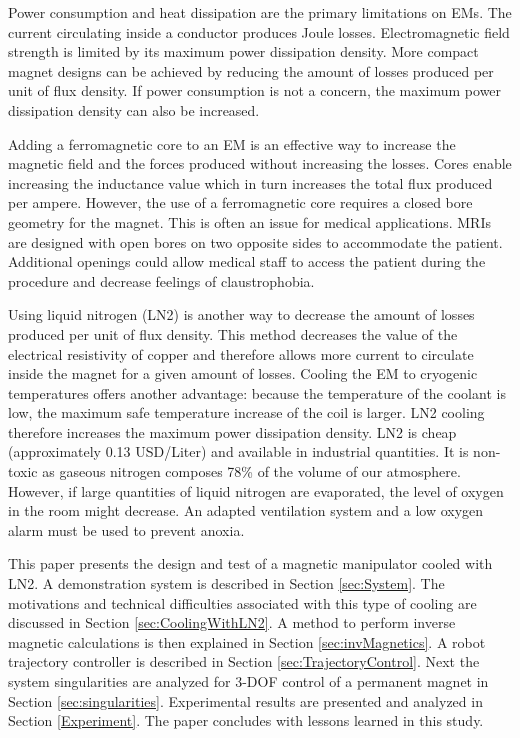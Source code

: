  Power consumption and heat dissipation are the primary limitations on EMs. 
 The current circulating inside a conductor produces Joule losses.
 Electromagnetic field strength is limited by its maximum power dissipation density. 
  More compact magnet designs can be achieved by reducing the amount of losses produced per unit of flux density. 
  If power consumption is not a concern, the maximum power dissipation density can also be increased.\par
Adding a ferromagnetic core to an EM is an effective way to increase the magnetic field and the forces produced without increasing the losses.
 Cores enable increasing the inductance value which in turn increases the total flux produced per ampere. 
 However, the use of a ferromagnetic core requires a closed bore geometry for the magnet. 
 This is often an issue for medical applications. 
  MRIs are designed with open bores on two opposite sides to accommodate the patient. 
 Additional openings could allow medical staff to access the patient during the procedure and decrease feelings of claustrophobia.\par    
Using liquid nitrogen (LN2) is another way to decrease the amount of losses produced per unit of flux density. 
This method decreases the value of the electrical resistivity of copper and therefore allows more current to circulate inside the magnet for a given amount of losses. 
Cooling the EM to cryogenic temperatures offers another advantage: because the temperature of the coolant is low, the maximum safe temperature increase of the coil is larger. 
LN2 cooling therefore increases the maximum power dissipation density. 
LN2 is cheap (approximately 0.13 USD/Liter) and available in industrial quantities. 
It is non-toxic as gaseous nitrogen composes 78\% of the volume of our atmosphere. However, if large quantities of liquid nitrogen are evaporated, the level of oxygen in the room might decrease. An adapted ventilation system and a low oxygen alarm must be used to prevent anoxia. \par
This paper presents the design and test of a magnetic manipulator cooled with LN2. 
A demonstration system is described in Section \ref{sec:System}.
The motivations and technical difficulties associated with this type of cooling are discussed in Section \ref{sec:CoolingWithLN2}.
A method to perform inverse magnetic calculations is then explained in Section \ref{sec:invMagnetics}.
 A robot trajectory controller is described in Section \ref{sec:TrajectoryControl}. 
 Next the system singularities are analyzed for 3-DOF control of a permanent magnet in Section \ref{sec:singularities}. 
  Experimental results are presented and analyzed in Section \ref{Experiment}. The paper concludes with lessons learned in this study.\par

